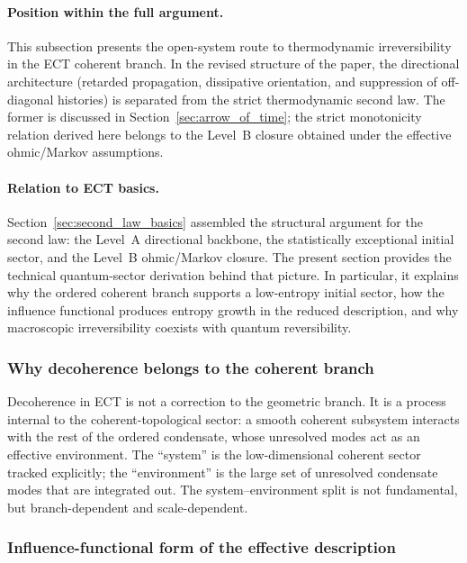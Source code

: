 \documentclass[11pt,a4paper]{article}
\numberwithin{equation}{section}
\begin{document}
\paragraph{Position within the full argument.}
This subsection presents the open-system route to thermodynamic
irreversibility in the ECT coherent branch.
In the revised structure of the paper, the directional architecture
(retarded propagation, dissipative orientation, and suppression of
off-diagonal histories) is separated from the strict thermodynamic
second law.
The former is discussed in Section~\ref{sec:arrow_of_time}; the
strict monotonicity relation derived here belongs to the Level~B
closure obtained under the effective ohmic/Markov assumptions.

\paragraph{Relation to ECT basics.}
Section~\ref{sec:second_law_basics} assembled the structural
argument for the second law:
the Level~A directional backbone, the statistically exceptional
initial sector, and the Level~B ohmic/Markov closure.
The present section provides the technical quantum-sector derivation
behind that picture.
In particular, it explains why the ordered coherent branch supports
a low-entropy initial sector, how the influence functional produces
entropy growth in the reduced description, and why macroscopic
irreversibility coexists with quantum reversibility.

\subsubsection*{Why decoherence belongs to the coherent branch}

Decoherence in ECT is not a correction to the geometric branch.
It is a process internal to the coherent-topological sector:
a smooth coherent subsystem interacts with the rest of the ordered
condensate, whose unresolved modes act as an effective environment.
The ``system'' is the low-dimensional coherent sector tracked
explicitly; the ``environment'' is the large set of unresolved
condensate modes that are integrated out.
The system--environment split is not fundamental, but branch-dependent
and scale-dependent.

\subsubsection*{Influence-functional form of the effective description}
\end{document}
